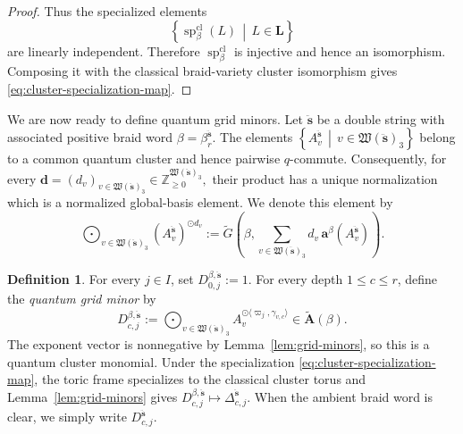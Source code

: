 \documentclass[12pt, reqno]{amsart}
\theoremstyle{plain}
\theoremstyle{definition}
\newtheorem{definition}[theorem]{Definition}
\numberwithin{equation}{section}
\newcommand{\ZZ}{\mathbb{Z}}
\begin{document}
\begin{proof}
Thus the specialized elements
\[
    \left\{
        \operatorname{sp}^{\mathrm{cl}}_\beta(L)
        \,\middle|\,
        L\in\mathbf L
    \right\}
\]
are linearly independent. Therefore
\(\operatorname{sp}^{\mathrm{cl}}_\beta\) is injective and hence an
isomorphism. Composing it with the classical braid-variety cluster
isomorphism gives \eqref{eq:cluster-specialization-map}.
\end{proof}
We are now ready to define quantum grid minors. Let
\(\ddot{\mathbf s}\) be a double string with associated positive braid
word
\(
    \beta=\beta_r^{\ddot{\mathbf s}}.
\)
The elements
\(
    \left\{
        A_v^{\ddot{\mathbf s}}
        \,\middle|\,
        v\in\mathfrak W(\ddot{\mathbf s})_3
    \right\}
\)
belong to a common quantum cluster and hence pairwise
\(q\)-commute. Consequently, for every
\(
    \mathbf d=(d_v)_
    {v\in\mathfrak W(\ddot{\mathbf s})_3}
    \in
    \ZZ_{\geq0}^{\mathfrak W(\ddot{\mathbf s})_3},
\)
their product has a unique normalization which is a normalized
global-basis element. We denote this element by
\begin{equation}\label{eq:normalized-product-global-basis}
    \bigodot_{
        v\in\mathfrak W(\ddot{\mathbf s})_3
    }
    \left(A_v^{\ddot{\mathbf s}}\right)^{\odot d_v}
    :=
    \widetilde G\left(
        \beta,
        \sum_{
            v\in\mathfrak W(\ddot{\mathbf s})_3
        }
        d_v\,
        \mathbf a^\beta
        \left(A_v^{\ddot{\mathbf s}}\right)
    \right).
\end{equation}

\begin{definition}
\label{def:quantum-grid-minors}
For every \(j\in I\), set \(D_{0,j}^{\beta,\ddot{\mathbf s}}:=1\).
For every depth \(1\leq c\leq r\), define the \emph{quantum grid
minor} by
\begin{equation}
 D_{c,j}^{\beta,\ddot{\mathbf s}}
 :=
 \bigodot_{v\in\mathfrak W(\ddot{\mathbf s})_3}
 A_v^{\odot\langle\varpi_j,\gamma_{v,c}\rangle}
 \in\widetilde{\mathbf A}(\beta).
 \label{eq:def-quantum-grid-minor}
\end{equation}
The exponent vector is nonnegative by Lemma~\ref{lem:grid-minors}, so
this is a quantum cluster monomial. Under the specialization
\eqref{eq:cluster-specialization-map}, the toric frame specializes to
the classical cluster torus and Lemma~\ref{lem:grid-minors} gives
\(D_{c,j}^{\beta,\ddot{\mathbf s}}\mapsto
\Delta_{c,j}^{\ddot{\mathbf s}}\).
When the ambient braid word is clear, we simply write
\(D_{c,j}^{\ddot{\mathbf s}}\).
\end{definition}
\end{document}
